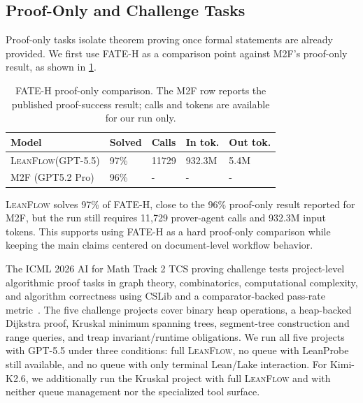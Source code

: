 \documentclass{article}
\newcommand{\method}{\textsc{LeanFlow}\xspace}
\newcommand{\kimi}{Kimi-K2.6\xspace}
\newcommand{\gpt}{GPT-5.5\xspace}
\newcommand{\lean}{Lean\xspace}
\begin{document}
\subsection{Proof-Only and Challenge Tasks}

Proof-only tasks isolate theorem proving once formal statements are already provided.
We first use FATE-H as a comparison point against M2F's proof-only result, as shown in \cref{tab:fate-calibration}.

\begin{table}[t]
\centering
\caption{FATE-H proof-only comparison. The M2F row reports the published proof-success result; calls and tokens are available for our run only.}
\label{tab:fate-calibration}
\scriptsize
\setlength{\tabcolsep}{5pt}
\begin{tabular}{lllll}
\toprule
Model & Solved & Calls & In tok. & Out tok. \\
\midrule
\method (\gpt) & 97\% & 11729 & 932.3M & 5.4M \\
M2F (GPT5.2 Pro) & 96\% & - & - & - \\
\bottomrule
\end{tabular}
\end{table}

\method solves 97\% of FATE-H, close to the 96\% proof-only result reported for M2F, but the run still requires 11,729 prover-agent calls and 932.3M input tokens.
This supports using FATE-H as a hard proof-only comparison while keeping the main claims centered on document-level workflow behavior.

The ICML 2026 AI for Math Track 2 TCS proving challenge tests project-level algorithmic proof tasks in graph theory, combinatorics, computational complexity, and algorithm correctness using CSLib and a comparator-backed pass-rate metric~\citep{ai4math2026challenge}.
The five challenge projects cover binary heap operations, a heap-backed Dijkstra proof, Kruskal minimum spanning trees, segment-tree construction and range queries, and treap invariant/runtime obligations.
We run all five projects with \gpt under three conditions: full \method, no queue with LeanProbe still available, and no queue with only terminal \lean/Lake interaction.
For \kimi, we additionally run the Kruskal project with full \method and with neither queue management nor the specialized tool surface.
\end{document}
